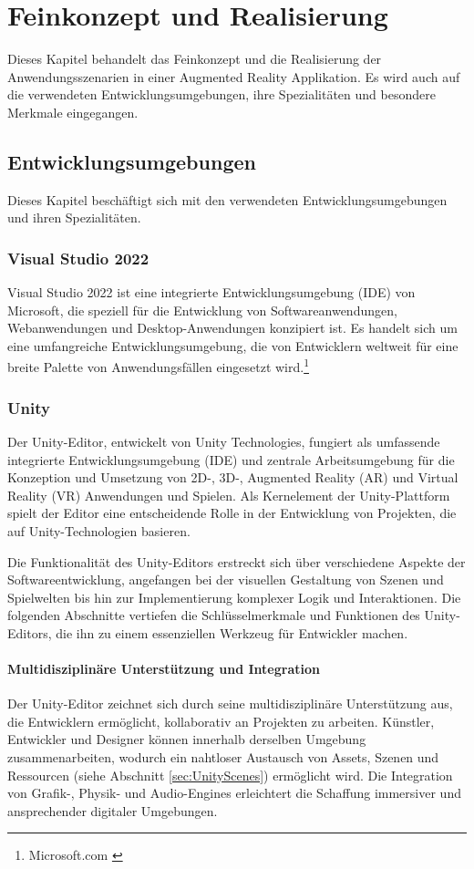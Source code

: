 \chapter{Feinkonzept und Realisierung}
Dieses Kapitel behandelt das Feinkonzept und die Realisierung der Anwendungsszenarien in einer Augmented Reality Applikation.
Es wird auch auf die verwendeten Entwicklungsumgebungen, ihre Spezialitäten und besondere Merkmale eingegangen.

\section{Entwicklungsumgebungen}
Dieses Kapitel beschäftigt sich mit den verwendeten Entwicklungsumgebungen und ihren Spezialitäten.

\subsection{Visual Studio 2022}
Visual Studio 2022 ist eine integrierte Entwicklungsumgebung (IDE) von Microsoft, die speziell für die Entwicklung von
Softwareanwendungen, Webanwendungen und Desktop-Anwendungen konzipiert ist. Es handelt sich um eine umfangreiche
Entwicklungsumgebung, die von Entwicklern weltweit für eine breite Palette von Anwendungsfällen eingesetzt wird.\footnote{Microsoft.com \cite{Visual Studio 2022}}

\subsection{Unity}
Der Unity-Editor, entwickelt von Unity Technologies, fungiert als umfassende integrierte Entwicklungsumgebung (IDE)
und zentrale Arbeitsumgebung für die Konzeption und Umsetzung von 2D-, 3D-, Augmented Reality (AR) und Virtual Reality
(VR) Anwendungen und Spielen. Als Kernelement der Unity-Plattform spielt der Editor eine entscheidende Rolle in der
Entwicklung von Projekten, die auf Unity-Technologien basieren.

Die Funktionalität des Unity-Editors erstreckt sich über verschiedene Aspekte der Softwareentwicklung, angefangen bei
der visuellen Gestaltung von Szenen und Spielwelten bis hin zur Implementierung komplexer Logik und Interaktionen. Die
folgenden Abschnitte vertiefen die Schlüsselmerkmale und Funktionen des Unity-Editors, die ihn zu einem essenziellen
Werkzeug für Entwickler machen.

\subsubsection{Multidisziplinäre Unterstützung und Integration}
Der Unity-Editor zeichnet sich durch seine multidisziplinäre Unterstützung aus, die Entwicklern ermöglicht, kollaborativ
an Projekten zu arbeiten. Künstler, Entwickler und Designer können innerhalb derselben Umgebung zusammenarbeiten,
wodurch ein nahtloser Austausch von Assets, Szenen und Ressourcen (siehe Abschnitt \ref{sec:UnityScenes}) ermöglicht wird. Die Integration von Grafik-,
Physik- und Audio-Engines erleichtert die Schaffung immersiver und ansprechender digitaler Umgebungen.

